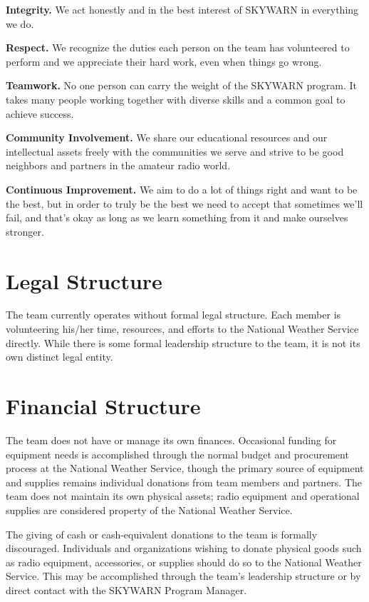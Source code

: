 \documentclass[pdflatex,letterpaper,twoside,12pt]{book}
\begin{document}
\textbf{Integrity.} We act honestly and in the best interest of SKYWARN in everything we do.

\textbf{Respect.} We recognize the duties each person on the team has volunteered to perform and we appreciate their hard work, even when things go wrong.

\textbf{Teamwork.} No one person can carry the weight of the SKYWARN program. It takes many people working together with diverse skills and a common goal to achieve success.

\textbf{Community Involvement.} We share our educational resources and our intellectual assets freely with the communities we serve and strive to be good neighbors and partners in the amateur radio world.

\textbf{Continuous Improvement.} We aim to do a lot of things right and want to be the best, but in order to truly be the best we need to accept that sometimes we'll fail, and that's okay as long as we learn something from it and make ourselves stronger.


\section{Legal Structure}

The team currently operates without formal legal structure.  Each member is volunteering his/her time, resources, and efforts to the National Weather Service directly.  While there is some formal leadership structure to the team, it is not its own distinct legal entity.


\section{Financial Structure}

The team does not have or manage its own finances.  Occasional funding for equipment needs is accomplished through the normal budget and procurement process at the National Weather Service, though the primary source of equipment and supplies remains individual donations from team members and partners.  The team does not maintain its own physical assets; radio equipment and operational supplies are considered property of the National Weather Service.

The giving of cash or cash-equivalent donations to the team is formally discouraged.  Individuals and organizations wishing to donate physical goods such as radio equipment, accessories, or supplies should do so to the National Weather Service.  This may be accomplished through the team's leadership structure or by direct contact with the SKYWARN Program Manager.
\end{document}
